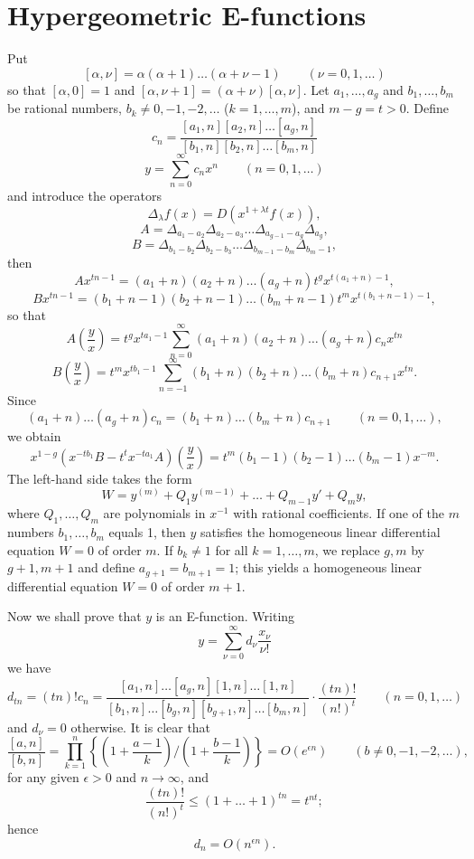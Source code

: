 \section{Hypergeometric E-functions}

Put
\[[\alpha, \nu] = \alpha(\alpha + 1) \dots (\alpha + \nu - 1) \qquad (\nu = 0, 1, \dots)\]
so that $[\alpha, 0] = 1$ and $[\alpha, \nu+1] = (\alpha+\nu)[\alpha, \nu]$. Let $a_1, \dots, a_g$ and $b_1, \dots, b_m$ be rational numbers, $b_k \neq 0, -1, -2, \dots$ ($k=1, \dots, m$), and $m-g=t > 0$. Define
\[c_{n} = \frac{[a_{1},n][a_{2},n]\dots[a_{g},n]}{[b_{1},n][b_{2},n]\dots[b_{m},n]}\]
\[y = \sum_{n=0}^{\infty} c_{n}x^{n} \qquad (n=0,1,\dots)\]
and introduce the operators
\[\Delta_{\lambda} f(x) = D(x^{1+\lambda t} f(x)),\]
\[A = \Delta_{a_1 - a_2} \Delta_{a_2 - a_3} \dots \Delta_{a_{g-1} - a_g} \Delta_{a_g},\]
\[B = \Delta_{b_1 - b_2} \Delta_{b_2 - b_3} \dots \Delta_{b_{m-1} - b_m} \Delta_{b_m - 1},\]
then
\[A x^{tn-1} = (a_1+n)(a_2+n) \dots (a_g+n)t^g x^{t(a_1+n)-1},\]
\[B x^{tn-1} = (b_1+n-1)(b_2+n-1) \dots (b_m+n-1)t^m x^{t(b_1+n-1)-1},\]
so that
\[A \left(\frac{y}{x}\right) = t^g x^{ta_1-1} \sum_{n=0}^{\infty} (a_1+n)(a_2+n) \dots (a_g+n)c_n x^{tn}\]
\[B \left(\frac{y}{x}\right) = t^{m} x^{tb_{1}-1} \sum_{n=-1}^{\infty} (b_{1}+n)(b_{2}+n) \dots (b_{m}+n) c_{n+1} x^{tn}.\]
Since
\[(a_1+n)\dots(a_g+n)c_n = (b_1+n)\dots(b_m+n)c_{n+1} \qquad (n=0,1,\dots),\]
we obtain
\[x^{1-g}(x^{-tb_1}B - t^t x^{-ta_1}A) \left(\frac{y}{x}\right) = t^m(b_1-1)(b_2-1)\dots(b_m-1)x^{-m}.\]
The left-hand side takes the form
\[W = y^{(m)} + Q_1 y^{(m-1)} + \dots + Q_{m-1} y' + Q_m y,\]
where $Q_1, \dots, Q_m$ are polynomials in $x^{-1}$ with rational coefficients. If one of the $m$ numbers $b_1, \dots, b_m$ equals 1, then $y$ satisfies the homogeneous linear differential equation $W=0$ of order $m$. If $b_k \neq 1$ for all $k=1,\dots,m$, we replace $g,m$ by $g+1, m+1$ and define $a_{g+1}=b_{m+1}=1$; this yields a homogeneous linear differential equation $W=0$ of order $m+1$.

Now we shall prove that $y$ is an E-function. Writing
\[y = \sum_{\nu=0}^{\infty} d_{\nu} \frac{x_{\nu}}{\nu!}\]
we have
\begin{equation}
d_{tn} = (tn)! c_{n} = \frac{[a_{1},n]\dots[a_{g},n][1,n]\dots[1,n]}{[b_{1},n]\dots[b_{g},n][b_{g+1},n]\dots[b_{m},n]} \cdot \frac{(tn)!}{(n!)^{t}} \qquad (n=0,1,\dots) \tag{87}\label{eq:87}
\end{equation}
and $d_{\nu} = 0$ otherwise. It is clear that
\[\frac{[a,n]}{[b,n]} = \prod_{k=1}^{n} \left\{ \left(1 + \frac{a-1}{k}\right) \Big/ \left(1 + \frac{b-1}{k}\right) \right\} = O(e^{\epsilon n}) \qquad (b \neq 0, -1, -2, \dots),\]
for any given $\epsilon > 0$ and $n \to \infty$, and
\[\frac{(tn)!}{(n!)^{t}} \le (1+\dots+1)^{tn} = t^{nt};\]
hence
\[d_n = O(n^{\epsilon n}).\]

